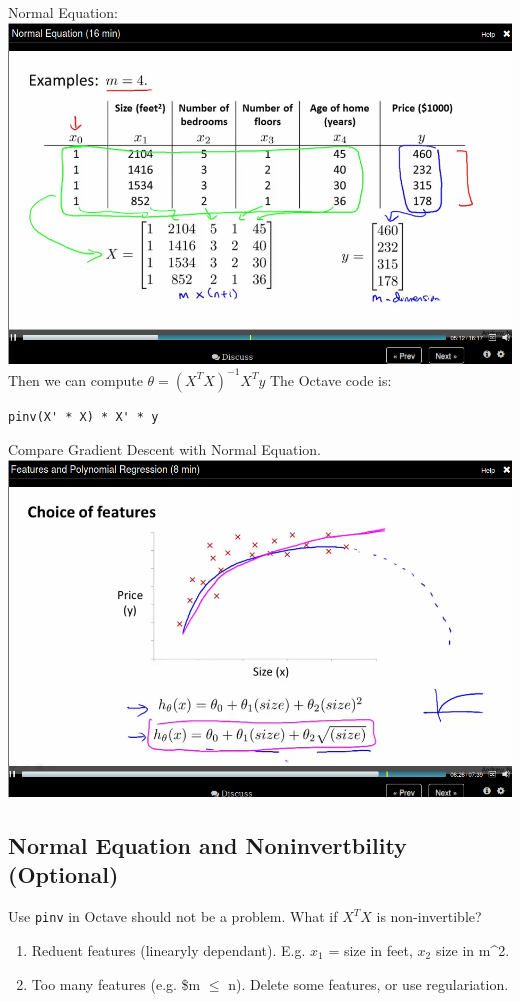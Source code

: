 \documentclass[11pt]{article}
\begin{document}
Normal Equation:
\includegraphics[width=.9\linewidth]{./images/screenshot-22.png}
Then we can compute $\theta = (X^T X)^{-1} X^T y$
The Octave code is:
\begin{verbatim}
pinv(X' * X) * X' * y
\end{verbatim}
Compare Gradient Descent with Normal Equation.
\includegraphics[width=.9\linewidth]{./images/screenshot-20.png}
\subsection*{Normal Equation and Noninvertbility (Optional)}
\label{sec-5-6}
Use \texttt{pinv} in Octave should not be a problem.
What if \(X^T X\) is non-invertible?
\begin{enumerate}
\item Reduent features (linearyly dependant).
E.g. $x_1$ = size in feet, $x_2$ size in m\^{}2.
\item Too many features (e.g. \$m $\le$ n).
Delete some features, or use regulariation.
\end{enumerate}
\end{document}
